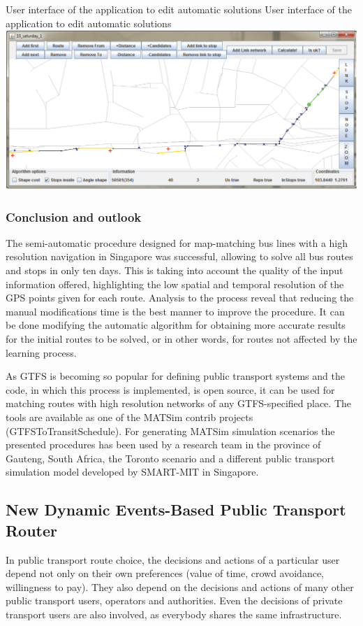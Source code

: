 \createfigure
{User interface of the application to edit automatic solutions}
{User interface of the application to edit automatic solutions}
{\label{fig:Application}}
{\includegraphics[width=1.0\textwidth]{extending/figures/semiAuto/Application.png}}
{}

\subsubsection{Conclusion and outlook}

The semi-automatic procedure designed for map-matching bus lines with a high resolution navigation in Singapore was successful, allowing to solve all bus routes and stops in only ten days. This is taking into account the quality of the input information offered, highlighting the low spatial and temporal resolution of the GPS points given for each route. Analysis to the process reveal that reducing the manual modifications time is the best manner to improve the procedure. It can be done modifying the automatic algorithm for obtaining more accurate results for the initial routes to be solved, or in other words, for routes not affected by the learning process.

As GTFS is becoming so popular for defining public transport systems and the code, in which this process is implemented, is open source, it can be used for matching routes with high resolution networks of any GTFS-specified place. The tools are available as one of the MATSim contrib projects (GTFSToTransitSchedule). For generating MATSim simulation scenarios the presented procedures has been used by a research team in the province of Gauteng, South Africa, the Toronto scenario and a different public transport simulation model developed by SMART-MIT in Singapore.

\subsection{New Dynamic Events-Based Public Transport Router}
In public transport route choice, the decisions and actions of a particular user depend not only on their own preferences (value of time, crowd avoidance, willingness to pay). They also depend on the decisions and actions of many other public transport users, operators and authorities. Even the decisions of private transport users are also involved, as everybody shares the same infrastructure.

